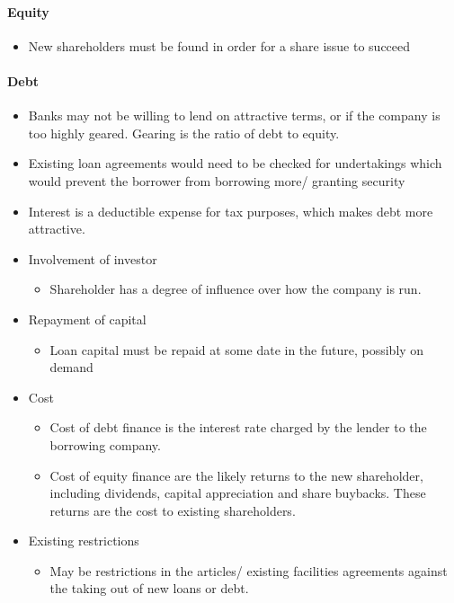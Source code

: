 \documentclass[
]{article}
\providecommand{\tightlist}{%
  \setlength{\itemsep}{0pt}\setlength{\parskip}{0pt}}
\begin{document}
\hypertarget{equity-4}{%
\paragraph{Equity}\label{equity-4}}

\begin{itemize}
\tightlist
\item
  New shareholders must be found in order for a share issue to succeed
\end{itemize}

\hypertarget{debt-4}{%
\paragraph{Debt}\label{debt-4}}

\begin{itemize}
\tightlist
\item
  Banks may not be willing to lend on attractive terms, or if the
  company is too highly geared. Gearing is the ratio of debt to equity.
\item
  Existing loan agreements would need to be checked for undertakings
  which would prevent the borrower from borrowing more/ granting
  security
\item
  Interest is a deductible expense for tax purposes, which makes debt
  more attractive.
\item
  Involvement of investor

  \begin{itemize}
  \tightlist
  \item
    Shareholder has a degree of influence over how the company is run.
  \end{itemize}
\item
  Repayment of capital

  \begin{itemize}
  \tightlist
  \item
    Loan capital must be repaid at some date in the future, possibly on
    demand
  \end{itemize}
\item
  Cost

  \begin{itemize}
  \tightlist
  \item
    Cost of debt finance is the interest rate charged by the lender to
    the borrowing company.
  \item
    Cost of equity finance are the likely returns to the new
    shareholder, including dividends, capital appreciation and share
    buybacks. These returns are the cost to existing shareholders.
  \end{itemize}
\item
  Existing restrictions

  \begin{itemize}
  \tightlist
  \item
    May be restrictions in the articles/ existing facilities agreements
    against the taking out of new loans or debt.
  \end{itemize}
\end{itemize}
\end{document}
